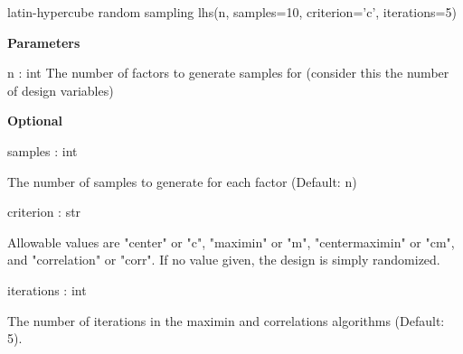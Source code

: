 \documentclass[10pt]{beamer}
\begin{document}
\begin{frame}{latin-hypercube random sampling}
lhs(n, samples=10, criterion='c', iterations=5)
    
    \textbf{Parameters}
    
    n : int
        The number of factors to generate samples for
        (consider this the number of design variables)
    
   \textbf{Optional}

    
    samples : int
    
        The number of samples to generate for each factor (Default: n)
    
    criterion : str
    
        Allowable values are "center" or "c", "maximin" or "m", 
        "centermaximin" or "cm", and "correlation" or "corr". If no value 
        given, the design is simply randomized.
        
    iterations : int
    
        The number of iterations in the maximin and correlations algorithms
        (Default: 5).
\end{frame}



%
\end{document}
